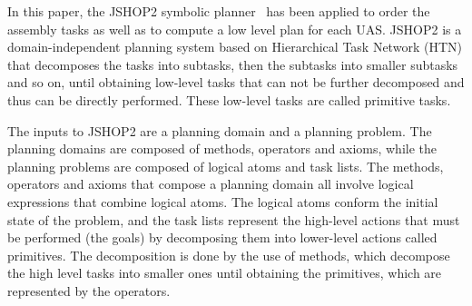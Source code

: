 \documentclass[letterpaper, 12pt, conference]{ieeeconf}    %
\begin{document}


In this paper, the JSHOP2 symbolic planner~\cite{Nau03shop2} has been applied to order the assembly tasks as well as to compute a low level plan for each UAS. JSHOP2 is a domain-independent planning system based on Hierarchical Task Network (HTN) that decomposes the tasks into subtasks, then the subtasks into smaller subtasks and so on, until obtaining low-level tasks that can not be further decomposed and thus can be directly performed. These low-level tasks are called primitive tasks.

The inputs to JSHOP2 are a planning domain and a planning problem. The planning domains are composed of methods, operators and axioms, while the planning problems are composed of logical atoms and task lists. The methods, operators and axioms that compose a planning domain all involve logical expressions that combine logical atoms. The logical atoms conform the initial state of the problem, and the task lists represent the high-level actions that must be performed (the goals) by decomposing them into lower-level actions called primitives. The decomposition is done by the use of methods, which decompose the high level tasks into smaller ones until obtaining the primitives, which are represented by the operators.
\end{document}
